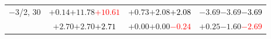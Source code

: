 \documentclass[compress]{beamer}
\begin{document}
\begin{frame}
\begin{tabular}{r | c | c | c}
$-$3/2, 30 & $+0.14$\hspace{0.1 cm}$+11.78$\hspace{0.1 cm}\textcolor{red}{$+10.61$} & $+0.73$\hspace{0.1 cm}$+2.08$\hspace{0.1 cm}\textcolor{black}{$+2.08$} & $-3.69$\hspace{0.1 cm}$-3.69$\hspace{0.1 cm}\textcolor{black}{$-3.69$} \\
           & $+2.70$\hspace{0.1 cm}$+2.70$\hspace{0.1 cm}\textcolor{black}{$+2.71$} & $+0.00$\hspace{0.1 cm}$+0.00$\hspace{0.1 cm}\textcolor{red}{$-0.24$} & $+0.25$\hspace{0.1 cm}$-1.60$\hspace{0.1 cm}\textcolor{red}{$-2.69$} \\
\end{tabular}
\end{frame}
\end{document}

